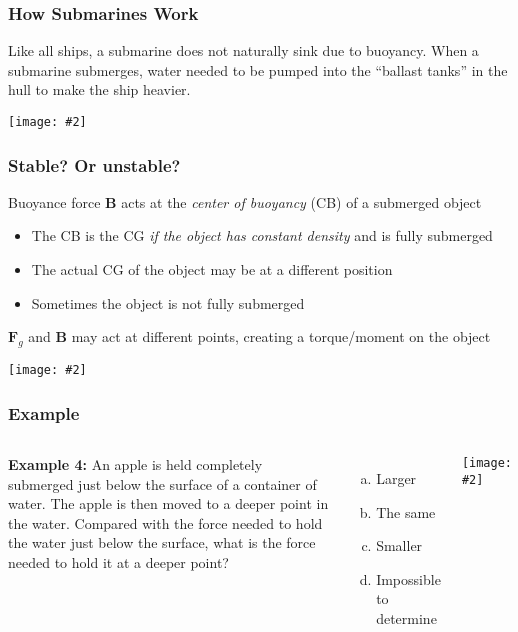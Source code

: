 \documentclass[12pt,aspectratio=169]{beamer}
\newcommand{\pic}[2]{\texttt{[image: \#2]}}
\newcommand{\mb}[1]{\mathbf{#1}}
\begin{document}
\begin{frame}
  \frametitle{How Submarines Work}
  Like all ships, a submarine does not naturally sink due to buoyancy. When a
  submarine submerges, water needed to be pumped into the  ``ballast tanks'' in
  the hull to make the ship heavier.
  \begin{center}
    \pic{1}{risinglemur.jpg}
  \end{center}
\end{frame}



\begin{frame}
  \frametitle{Stable? Or unstable?}
  Buoyance force $\mb{B}$ acts at the \emph{center of buoyancy} (CB) of a
  submerged object
  \begin{itemize}
  \item The CB is the CG \emph{if the object has constant density} and is
    fully submerged
  \item The actual CG of the object may be at a different position
  \item Sometimes the object is not fully submerged
  \end{itemize}
  
  $\mb{F}_g$ and $\mb{B}$ may act at different points, creating a torque/moment
  on the object
  \begin{center}
    \pic{.5}{stable-unstable.jpg}
  \end{center}
\end{frame}



\begin{frame}
  \frametitle{Example}
  \begin{columns}

    \textbf{Example 4:} An apple is held completely submerged just below the
    surface of a container of water. The apple is then moved to a deeper point
    in the water. Compared with the force needed to hold the water just below
    the surface, what is the force needed to hold it at a deeper point?
    \begin{enumerate}[(a)]
    \item Larger
    \item The same
    \item Smaller
    \item Impossible to determine
    \end{enumerate}

    \pic{1}{apple.jpg}
  \end{columns}
\end{frame}
\end{document}
